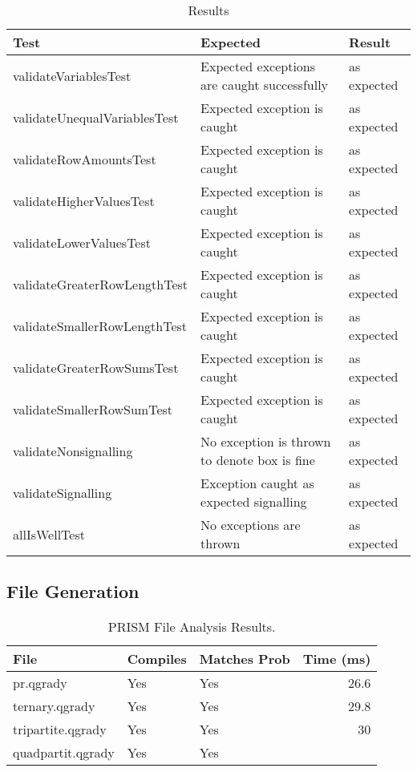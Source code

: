 \documentclass[report.tex]{subfiles}
\begin{document}
\begin{table}[H]
    \centering
    \begin{tabular}{l | p{6cm} | l}
    Test & Expected & Result \\    
    \hline
    validateVariablesTest & Expected exceptions are caught successfully 
    & as expected \\
    validateUnequalVariablesTest & Expected exception is caught 
    & as expected \\
    validateRowAmountsTest & Expected exception is caught & as expected \\
    validateHigherValuesTest & Expected exception is caught & as expected \\
    validateLowerValuesTest & Expected exception is caught & as expected \\
    validateGreaterRowLengthTest & Expected exception is caught & as expected \\
    validateSmallerRowLengthTest & Expected exception is caught & as expected \\
    validateGreaterRowSumsTest & Expected exception is caught & as expected \\
    validateSmallerRowSumTest & Expected exception is caught & as expected \\
    validateNonsignalling & No exception is thrown to denote box is fine & as expected \\
    validateSignalling & Exception caught as expected signalling & as expected \\
    allIsWellTest & No exceptions are thrown & as expected \\
    \end{tabular}
    \caption{Results}
  \label{tab:semantics_result}
\end{table}

\subsection{File Generation} %
\label{sub:file_generation}
\begin{table}[H]
  \centering
  \begin{tabular}{l | l | l | r}
    File & Compiles & Matches Prob & Time (ms)\\
    \hline
    pr.qgrady & Yes & Yes & 26.6 \\
    ternary.qgrady & Yes & Yes & 29.8 \\
    tripartite.qgrady & Yes & Yes & 30\\
    quadpartit.qgrady & Yes & Yes &
  \end{tabular}
  \caption{PRISM File Analysis Results.}
  \label{tab:prism_result}
\end{table}
\end{document}
